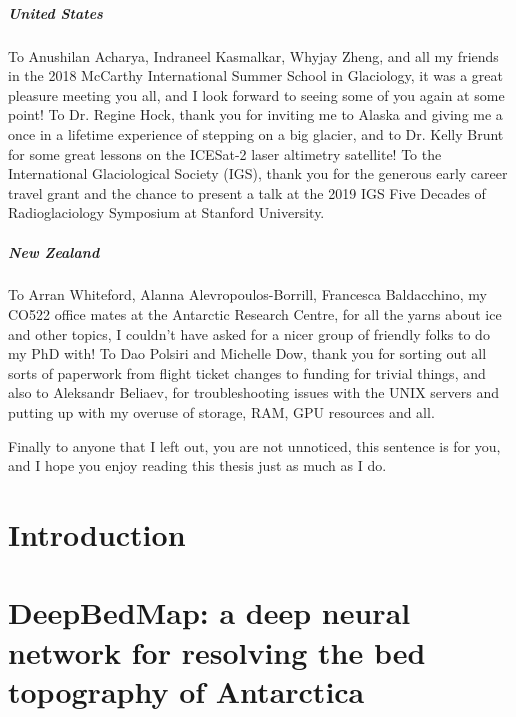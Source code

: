 \documentclass[12pt,twoside]{book}
\begin{document}
\begin{CJK*}{UTF8}{gbsn}
\paragraph{United States}

To Anushilan Acharya, Indraneel Kasmalkar, Whyjay Zheng, and all my friends in the 2018 McCarthy International Summer School in Glaciology, it was a great pleasure meeting you all, and I look forward to seeing some of you again at some point!
To Dr. Regine Hock, thank you for inviting me to Alaska and giving me a once in a lifetime experience of stepping on a big glacier, and to Dr. Kelly Brunt for some great lessons on the ICESat-2 laser altimetry satellite!
To the International Glaciological Society (IGS), thank you for the generous early career travel grant and the chance to present a talk at the 2019 IGS Five Decades of Radioglaciology Symposium at Stanford University.

\paragraph{New Zealand}

To Arran Whiteford, Alanna Alevropoulos-Borrill, Francesca Baldacchino, my CO522 office mates at the Antarctic Research Centre, for all the yarns about ice and other topics, I couldn't have asked for a nicer group of friendly folks to do my PhD with!
To Dao Polsiri and Michelle Dow, thank you for sorting out all sorts of paperwork from flight ticket changes to funding for trivial things, and also to Aleksandr Beliaev, for troubleshooting issues with the UNIX servers and putting up with my overuse of storage, RAM, GPU resources and all.

Finally to anyone that I left out, you are not unnoticed, this sentence is for you, and I hope you enjoy reading this thesis just as much as I do.

\end{CJK*}

\tableofcontents
\listoffigures
\listoftables

\printglossary[type=\acronymtype]

\chapter{Introduction}


\chapter{DeepBedMap: a deep neural network for resolving the bed topography of Antarctica}
\label{ch:2}

\end{document}
